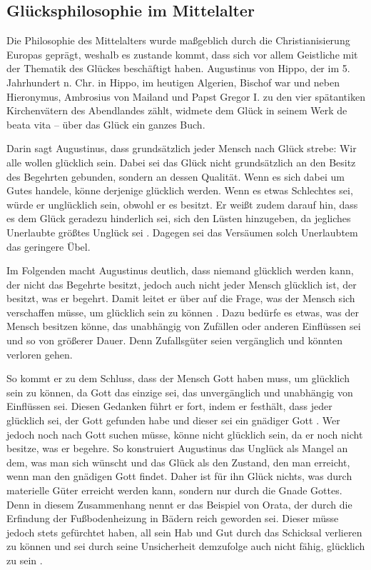 \newpage

\subsection{Glücksphilosophie im Mittelalter}

Die Philosophie des Mittelalters wurde maßgeblich durch die Christianisierung Europas geprägt, weshalb es zustande kommt, dass sich vor allem Geistliche mit der Thematik des Glückes beschäftigt haben. 
Augustinus von Hippo, der im 5. Jahrhundert n. Chr. in Hippo, im heutigen Algerien, Bischof war und neben Hieronymus, Ambrosius von Mailand und Papst Gregor I. zu den vier spätantiken Kirchenvätern des Abendlandes zählt, widmete dem Glück in seinem Werk \glqq de beata vita -- über das Glück\grqq{} ein ganzes Buch.

Darin sagt Augustinus, dass grundsätzlich jeder Mensch nach Glück strebe: \glqq Wir alle wollen glücklich sein.\grqq{} \cite[S.\,21]{A82}
Dabei sei das Glück nicht grundsätzlich an den Besitz des Begehrten gebunden, sondern an dessen Qualität. 
Wenn es sich dabei um Gutes handele, könne derjenige glücklich werden. 
Wenn es etwas Schlechtes sei, würde er unglücklich sein, obwohl er es besitzt. 
Er weißt zudem darauf hin, dass es dem Glück geradezu hinderlich sei, sich den Lüsten hinzugeben, da jegliches Unerlaubte größtes Unglück sei \cite[S.\,21]{A82}.
Dagegen sei das Versäumen solch Unerlaubtem das geringere Übel.

Im Folgenden macht Augustinus deutlich, dass niemand glücklich werden kann, der nicht das Begehrte besitzt, jedoch auch nicht jeder Mensch glücklich ist, der besitzt, was er begehrt. 
Damit leitet er über auf die Frage, was der Mensch sich verschaffen müsse, um glücklich sein zu können \cite[S.\,23]{A82}.
Dazu bedürfe es etwas, was der Mensch besitzen könne, das unabhängig von Zufällen oder anderen Einflüssen sei und so von größerer Dauer. 
Denn Zufallsgüter seien vergänglich und könnten verloren gehen. 

So kommt er zu dem Schluss, dass der Mensch Gott haben muss, um glücklich sein zu können, da Gott das einzige sei, das unvergänglich und unabhängig von Einflüssen sei. 
Diesen Gedanken führt er fort, indem er festhält, dass jeder glücklich sei, der Gott gefunden habe und dieser sei ein gnädiger Gott \cite[S.\,41]{A82}. 
Wer jedoch noch nach Gott suchen müsse, könne nicht glücklich sein, da er noch nicht besitze, was er begehre. 
So konstruiert Augustinus das Unglück als Mangel an dem, was man sich wünscht und das Glück als den Zustand, den man erreicht, wenn man den gnädigen Gott findet. 
Daher ist für ihn Glück nichts, was durch materielle Güter erreicht werden kann, sondern nur durch die Gnade Gottes. 
Denn in diesem Zusammenhang nennt er das Beispiel von Orata, der durch die Erfindung der Fußbodenheizung in Bädern reich geworden sei. 
Dieser müsse jedoch stets gefürchtet haben, all sein Hab und Gut durch das Schicksal verlieren zu können und sei durch seine Unsicherheit demzufolge auch nicht fähig, glücklich zu sein \cite[S.\,48]{A82}.

